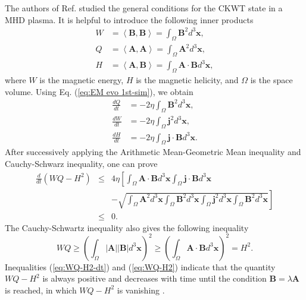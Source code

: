 \documentclass[english,aps,superscriptaddress,preprint]{revtex4-1}
\begin{document}
The authors of Ref. \citep{Qin2012} studied the general conditions
for the  CKWT state in a MHD plasma. It is helpful to introduce the
following inner products 
\begin{align}
W & =\left\langle \boldsymbol{B},\boldsymbol{B}\right\rangle =\int_{\Omega}\boldsymbol{B}^{2}d^{3}\boldsymbol{x},\nonumber \\
Q & =\left\langle \boldsymbol{A},\boldsymbol{A}\right\rangle =\int_{\Omega}\boldsymbol{A}^{2}d^{3}\boldsymbol{x},\nonumber \\
H & =\left\langle \boldsymbol{A},\boldsymbol{B}\right\rangle =\int_{\Omega}\boldsymbol{A}\cdot\boldsymbol{B}d^{3}\boldsymbol{x},\label{eq:wqh-bb-aa-ab}
\end{align}
where $W$ is the magnetic energy, $H$ is the magnetic helicity,
and $\Omega$ is the space volume. Using Eq. (\ref{eq:EM evo 1st-sim}),
we obtain 
\begin{align}
\frac{dQ}{dt} & =-2\eta\int_{\Omega}\boldsymbol{B}^{2}d^{3}\boldsymbol{x},\nonumber \\
\frac{dW}{dt} & =-2\eta\int_{\Omega}\boldsymbol{j}^{2}d^{3}\boldsymbol{x},\nonumber \\
\frac{dH}{dt} & =-2\eta\int_{\Omega}\boldsymbol{j}\cdot\boldsymbol{B}d^{3}\boldsymbol{x}.\label{eq:t-deriv-qwh}
\end{align}
After successively applying the Arithmetic Mean-Geometric Mean inequality
and Cauchy-Schwarz inequality, one can prove \citep{Qin2012}
\begin{eqnarray}
\frac{d}{dt}(WQ-H^{2}) & \leq & 4\eta\left[\int_{\Omega}\boldsymbol{A}\cdot\boldsymbol{B}d^{3}\boldsymbol{x}\int_{\Omega}\boldsymbol{j}\cdot\boldsymbol{B}d^{3}\boldsymbol{x}\right.\nonumber \\
 &  & \left.-\sqrt{\int_{\Omega}\boldsymbol{A}^{2}d^{3}\boldsymbol{x}\int_{\Omega}\boldsymbol{B}^{2}d^{3}\boldsymbol{x}\int_{\Omega}\boldsymbol{j}^{2}d^{3}\boldsymbol{x}\int_{\Omega}\boldsymbol{B}^{2}d^{3}\boldsymbol{x}}\right]\nonumber \\
 & \leq & 0.\label{eq:WQ-H2-dt}
\end{eqnarray}
The Cauchy-Schwartz inequality also gives the following inequality
\begin{equation}
WQ\geq\left(\int_{\Omega}|\boldsymbol{A}||\boldsymbol{B}|d^{3}\boldsymbol{x}\right)^{2}\geq\left(\int_{\Omega}\boldsymbol{A}\cdot\boldsymbol{B}d^{3}\boldsymbol{x}\right)^{2}=H^{2}.\label{eq:WQ-H2}
\end{equation}
Inequalities (\ref{eq:WQ-H2-dt}) and (\ref{eq:WQ-H2}) indicate that
the quantity $WQ-H^{2}$ is always positive and decreases with time
until the condition $\boldsymbol{B}=\lambda\boldsymbol{A}$ is reached,
in which $WQ-H^{2}$ is vanishing \citep{Qin2012}.
\end{document}
